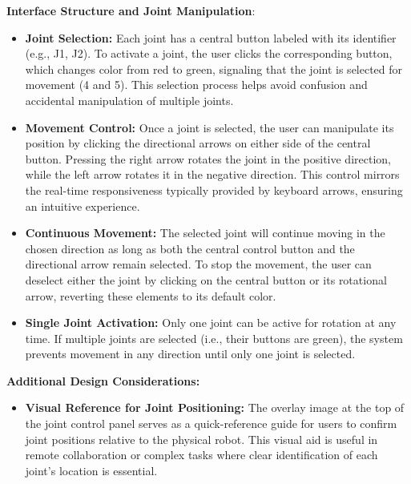 \textbf{Interface Structure and Joint Manipulation}:
\begin{itemize}
    \item \textbf{Joint Selection:} Each joint has a central button labeled with its identifier (e.g., J1, J2). To activate a joint, the user clicks the corresponding button, which changes color from red to green, signaling that the joint is selected for movement (4 and 5). This selection process helps avoid confusion and accidental manipulation of multiple joints.

    \item \textbf{Movement Control:} Once a joint is selected, the user can manipulate its position by clicking the directional arrows on either side of the central button. Pressing the right arrow rotates the joint in the positive direction, while the left arrow rotates it in the negative direction. This control mirrors the real-time responsiveness typically provided by keyboard arrows, ensuring an intuitive experience.

    \item \textbf{Continuous Movement:} The selected joint will continue moving in the chosen direction as long as both the central control button and the directional arrow remain selected. To stop the movement, the user can deselect either the joint by clicking on the central button or its rotational arrow, reverting these elements to its default color.

    \item \textbf{Single Joint Activation: }Only one joint can be active for rotation at any time. If multiple joints are selected (i.e., their buttons are green), the system prevents movement in any direction until only one joint is selected.

\end{itemize}

\newpage

\textbf{Additional Design Considerations: }
\begin{itemize}
    \item \textbf{Visual Reference for Joint Positioning:} The overlay image at the top of the joint control panel serves as a quick-reference guide for users to confirm joint positions relative to the physical robot. This visual aid is useful in remote collaboration or complex tasks where clear identification of each joint’s location is essential.

\end{itemize}

